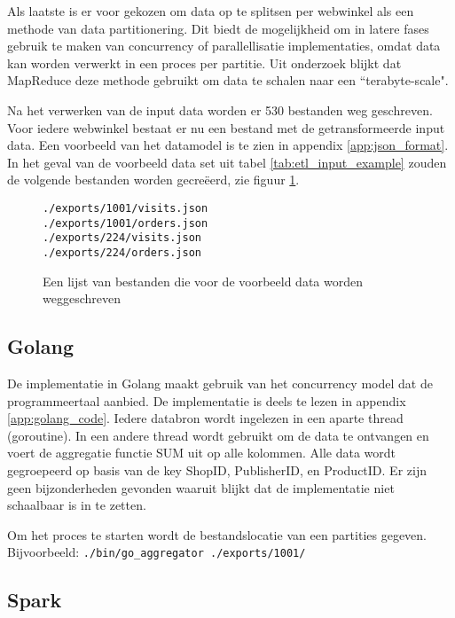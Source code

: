 Als laatste is er voor gekozen om data op te splitsen per webwinkel als een methode van data partitionering. Dit biedt de mogelijkheid om in latere fases gebruik te maken van concurrency of parallellisatie implementaties, omdat data kan worden verwerkt in een proces per partitie. Uit onderzoek blijkt dat MapReduce deze methode gebruikt om data te schalen naar een ``terabyte-scale".

Na het verwerken van de input data worden er 530 bestanden weg geschreven. Voor iedere webwinkel bestaat er nu een bestand met de getransformeerde input data. Een voorbeeld van het datamodel is te zien in appendix \ref{app:json_format}. In het geval van de voorbeeld data set uit tabel \ref{tab:etl_input_example} zouden de volgende bestanden worden gecreëerd, zie figuur \ref{fig:exports_files}. 

\begin{figure}[h]
    \caption{Een lijst van bestanden die voor de voorbeeld data worden weggeschreven}
    \label{fig:exports_files}
\begin{verbatim}
./exports/1001/visits.json
./exports/1001/orders.json
./exports/224/visits.json
./exports/224/orders.json
\end{verbatim}
\end{figure}


\clearpage

\subsection{Golang}


De implementatie in Golang maakt gebruik van het concurrency model dat de programmeertaal aanbied. De implementatie is deels te lezen in appendix \ref{app:golang_code}. Iedere databron  wordt ingelezen in een aparte thread (goroutine). In een andere thread wordt gebruikt om de data te ontvangen en voert de aggregatie functie SUM uit op alle kolommen. Alle data wordt gegroepeerd op basis van de key ShopID, PublisherID, en ProductID. Er zijn geen bijzonderheden gevonden waaruit blijkt dat de implementatie niet schaalbaar is in te zetten.

Om het proces te starten wordt de bestandslocatie van een partities gegeven. Bijvoorbeeld: \newline\verb+./bin/go_aggregator ./exports/1001/+

\subsection{Spark}


